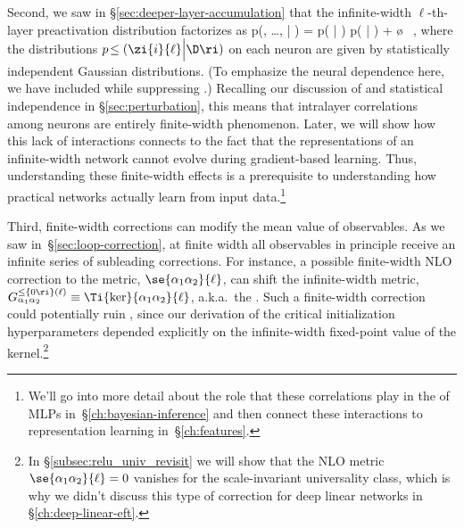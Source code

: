 Second, we saw in \S\ref{sec:deeper-layer-accumulation} that the infinite-width $\ell$-th-layer preactivation distribution factorizes as
\be\label{eq:infinite-distribution-factorization}
p\!\le(, \dots,  \Big| \D \ri) = p\!\le( \Big| \D \ri) \cdots p\!\le( \Big| \D \ri) + \o{} \, ,
\ee
where the distributions $p\!\le(\zi{i}{\ell} \Big| \D \ri)$ on each neuron are given by statistically independent Gaussian distributions.
(To emphasize the neural dependence here, we have included  while suppressing .)
Recalling our discussion of  and statistical independence in \S\ref{sec:perturbation}, this means that intralayer correlations among neurons are entirely finite-width phenomenon.
Later, we will show how this lack of interactions connects to the fact that the representations of an infinite-width network cannot evolve during gradient-based learning. Thus, understanding these finite-width effects is a prerequisite to understanding how  
practical networks actually learn 
from input data.\footnote{We'll go into more detail about the role that these correlations play in the  of MLPs in~\S\ref{ch:bayesian-inference} and then connect these interactions to representation learning in~\S\ref{ch:features}.}




Third, finite-width corrections can modify the mean value of observables.
As we saw in~\S\ref{sec:loop-correction}, at finite width all observables in principle receive an infinite series of subleading corrections. For instance, a possible finite-width NLO correction to the metric, $\se{\alpha_1\alpha_2}{\ell}$, can shift the infinite-width metric, $G_{\alpha_1\alpha_2}^{\le\{0\ri\}(\ell)} \equiv \Ti{\ker}{\alpha_1\alpha_2}{\ell}$, a.k.a.~the . 
Such a finite-width correction could potentially
ruin , since our derivation of the critical initialization hyperparameters depended explicitly on the infinite-width fixed-point value of the kernel.\footnote{
    In \S\ref{subsec:relu_univ_revisit} we will show that the NLO metric $\se{\alpha_1\alpha_2}{\ell}=0$ vanishes for the scale-invariant universality class, which is why we didn't discuss this type of correction for deep linear networks in \S\ref{ch:deep-linear-eft}.
} %





